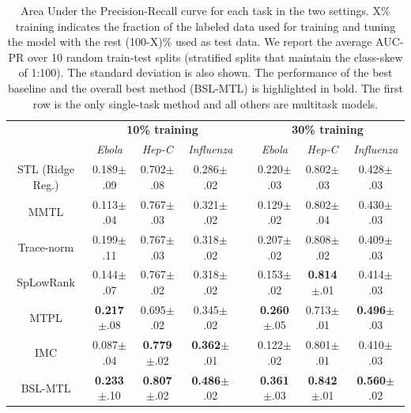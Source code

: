 \documentclass[runningheads,a4paper]{llncs}
\begin{document}
\begin{table}[t]\caption{Area Under the Precision-Recall curve for each task in the two settings. X\% training indicates the fraction of the labeled data used for training and tuning the model with the rest (100-X)\% used as test data. We report the average AUC-PR over 10 random train-test splits (stratified splits that maintain the class-skew of 1:100). The standard deviation is also shown. The performance of the best baseline and the overall best method (BSL-MTL) is highlighted in bold. The first row is the only single-task method and all others are multitask models.}
\label{resultsTable}
\begin{small}
\begin{center}
\def\arraystretch{1.2}
\begin{tabular}{c|ccccccc}
\toprule
& \multicolumn{3}{c}{\textbf{10\% training}} && \multicolumn{3}{c}{\textbf{30\% training}} \\ \cline{2-4}\cline{6-8}
& \textit{Ebola} & \textit{Hep-C} & \textit{Influenza} && \textit{Ebola} & \textit{Hep-C} & \textit{Influenza} \\ \midrule
STL (Ridge Reg.)  & 0.189$\pm$.09 & 0.702$\pm$.08 & 0.286$\pm$.02 && 0.220$\pm$.03 & 0.802$\pm$.03 & 0.428$\pm$.03 \\
MMTL \cite{pontil04} & 0.113$\pm$.04 & 0.767$\pm$.03 & 0.321$\pm$.02 && 0.129$\pm$.02 & 0.802$\pm$.04 & 0.430$\pm$.03  \\
Trace-norm  & 0.199$\pm$.11 & 0.767$\pm$.03 & 0.318$\pm$.02 && 0.207$\pm$.02 & 0.808$\pm$.02 & 0.409$\pm$.03 \\
SpLowRank \cite{chen2012} & 0.144$\pm$.07 & 0.767$\pm$.02 & 0.318$\pm$.02 && 0.153$\pm$.02 & \textbf{0.814}$\pm$.01 & 0.414$\pm$.03  \\
MTPL \cite{me_ismb_2013} & \textbf{0.217}$\pm$.08 & 0.695$\pm$.02 & 0.345$\pm$.02 && \textbf{0.260}$\pm$.05 & 0.713$\pm$.01 & \textbf{0.496}$\pm$.03 \\
IMC \cite{nagarajan} & 0.087$\pm$.04 & \textbf{0.779}$\pm$.02 & \textbf{0.362}$\pm$.01 && 0.122$\pm$.02 & 0.801$\pm$.01 & 0.410$\pm$.03  \\ \midrule
BSL-MTL & \textbf{0.233}$\pm$.10 & \textbf{0.807}$\pm$.02 & \textbf{0.486}$\pm$.02 && \textbf{0.361}$\pm$.03 & \textbf{0.842}$\pm$.01 & \textbf{0.560}$\pm$.02  \\ \bottomrule
\end{tabular}
\end{center}
\end{small}
\end{table}
\end{document}
